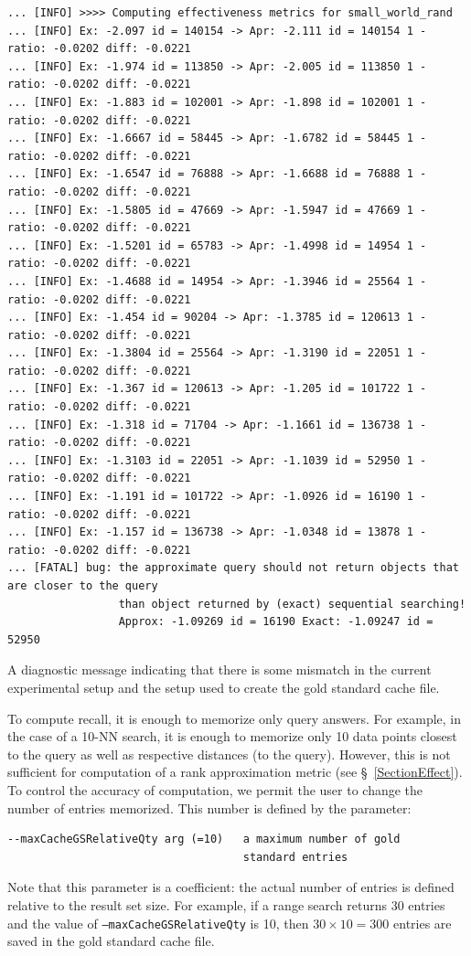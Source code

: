 \documentclass[runningheads,a4paper]{llncs}
\newcommand{\ttt}[1]{\texttt{#1}}
\begin{document}
{\begin{table}
\scriptsize
\begin{verbatim}
... [INFO] >>>> Computing effectiveness metrics for small_world_rand
... [INFO] Ex: -2.097 id = 140154 -> Apr: -2.111 id = 140154 1 - ratio: -0.0202 diff: -0.0221
... [INFO] Ex: -1.974 id = 113850 -> Apr: -2.005 id = 113850 1 - ratio: -0.0202 diff: -0.0221
... [INFO] Ex: -1.883 id = 102001 -> Apr: -1.898 id = 102001 1 - ratio: -0.0202 diff: -0.0221
... [INFO] Ex: -1.6667 id = 58445 -> Apr: -1.6782 id = 58445 1 - ratio: -0.0202 diff: -0.0221
... [INFO] Ex: -1.6547 id = 76888 -> Apr: -1.6688 id = 76888 1 - ratio: -0.0202 diff: -0.0221
... [INFO] Ex: -1.5805 id = 47669 -> Apr: -1.5947 id = 47669 1 - ratio: -0.0202 diff: -0.0221
... [INFO] Ex: -1.5201 id = 65783 -> Apr: -1.4998 id = 14954 1 - ratio: -0.0202 diff: -0.0221
... [INFO] Ex: -1.4688 id = 14954 -> Apr: -1.3946 id = 25564 1 - ratio: -0.0202 diff: -0.0221
... [INFO] Ex: -1.454 id = 90204 -> Apr: -1.3785 id = 120613 1 - ratio: -0.0202 diff: -0.0221
... [INFO] Ex: -1.3804 id = 25564 -> Apr: -1.3190 id = 22051 1 - ratio: -0.0202 diff: -0.0221
... [INFO] Ex: -1.367 id = 120613 -> Apr: -1.205 id = 101722 1 - ratio: -0.0202 diff: -0.0221
... [INFO] Ex: -1.318 id = 71704 -> Apr: -1.1661 id = 136738 1 - ratio: -0.0202 diff: -0.0221
... [INFO] Ex: -1.3103 id = 22051 -> Apr: -1.1039 id = 52950 1 - ratio: -0.0202 diff: -0.0221
... [INFO] Ex: -1.191 id = 101722 -> Apr: -1.0926 id = 16190 1 - ratio: -0.0202 diff: -0.0221
... [INFO] Ex: -1.157 id = 136738 -> Apr: -1.0348 id = 13878 1 - ratio: -0.0202 diff: -0.0221
... [FATAL] bug: the approximate query should not return objects that are closer to the query 
                 than object returned by (exact) sequential searching! 
                 Approx: -1.09269 id = 16190 Exact: -1.09247 id = 52950
\end{verbatim}
\caption{\label{TableFailGSCheck} A diagnostic message indicating that
there is some mismatch in the current experimental setup and the setup used to create
the gold standard cache file.}
\end{table}

To compute recall, it is enough to memorize only query answers.
For example, in the case of a 10-NN search, it is enough to memorize only 10 data points closest 
to the query as well as respective distances (to the query).
However, this is not sufficient for computation of  a rank approximation metric (see \S~\ref{SectionEffect}).
To control the accuracy of computation, we permit the user to change the number of entries memorized.
This number is defined by the parameter:
\begin{verbatim}
--maxCacheGSRelativeQty arg (=10)   a maximum number of gold 
                                    standard entries
\end{verbatim}
Note that this parameter is a coefficient: the actual number of entries is defined relative to
the result set size. For example, if a range search returns 30 entries and the value of 
\ttt{--maxCacheGSRelativeQty} is 10, then $30 \times 10=300$ entries are saved in the gold standard
cache file.

}
\end{document}
